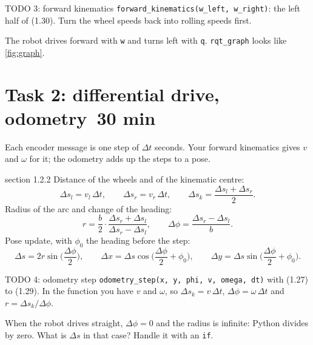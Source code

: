 \documentclass[11pt,a4paper,parskip=half]{scrartcl}
\newcommand{\thema}[1]{\texttt{#1}}
\newcommand{\minutes}[1]{\hfill{\normalsize\mdseries\color{ohmgrey}\faClock[regular]~#1 min}}
\begin{document}
\begin{todo}{TODO 3: forward kinematics}
\thema{forward\_kinematics(w\_left, w\_right)}: the left half of (1.30). Turn the wheel speeds back
into rolling speeds first.
\end{todo}

\begin{checkpoint}
The robot drives forward with \thema{w} and turns left with \thema{q}. \thema{rqt\_graph} looks like
\cref{fig:graph}.
\end{checkpoint}

\newpage
\section{Task 2: differential drive, odometry\minutes{30}}
\label{sec:task2}
Each encoder message is one step of \(\Delta t\) seconds. Your forward kinematics gives \(v\) and
\(\omega\) for it; the odometry adds up the steps to a pose.

\begin{script}{section 1.2.2}
Distance of the wheels and of the kinematic centre:
\begin{equation}
  \Delta s_l = v_l\,\Delta t, \qquad \Delta s_r = v_r\,\Delta t, \qquad
  \Delta s_k = \frac{\Delta s_l + \Delta s_r}{2}.
  \tag{1.27}
\end{equation}
Radius of the arc and change of the heading:
\begin{equation}
  r = \frac b2 \cdot \frac{\Delta s_r + \Delta s_l}{\Delta s_r - \Delta s_l}, \qquad
  \Delta\phi = \frac{\Delta s_r - \Delta s_l}{b}.
  \tag{1.28}
\end{equation}
Pose update, with \(\phi_0\) the heading before the step:
\begin{equation}
  \Delta s = 2r\sin\!\Big(\frac{\Delta\phi}{2}\Big), \qquad
  \Delta x = \Delta s\cos\!\Big(\frac{\Delta\phi}{2} + \phi_0\Big), \qquad
  \Delta y = \Delta s\sin\!\Big(\frac{\Delta\phi}{2} + \phi_0\Big).
  \tag{1.29}
\end{equation}
\end{script}

\begin{todo}{TODO 4: odometry step}
\thema{odometry\_step(x, y, phi, v, omega, dt)} with (1.27) to (1.29). In the function you have \(v\)
and \(\omega\), so \(\Delta s_k = v\,\Delta t\), \(\Delta\phi = \omega\,\Delta t\) and
\(r = \Delta s_k / \Delta\phi\).
\end{todo}

\begin{note}
When the robot drives straight, \(\Delta\phi = 0\) and the radius is infinite: Python divides by zero.
What is \(\Delta s\) in that case? Handle it with an \thema{if}.
\end{note}
\end{document}
